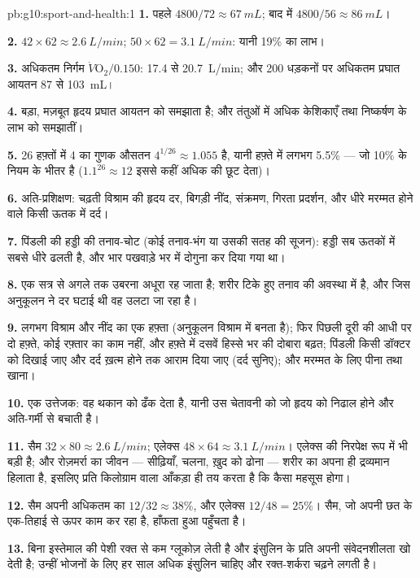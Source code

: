 \begin{solution}{pb:g10:sport-and-health:1}
\textbf{1.} पहले $4800/72 \approx \qty{67}{mL}$; बाद में $4800/56 \approx
\qty{86}{mL}$।

\textbf{2.} $42 \times 62 \approx \qty{2.6}{L/min}$; $50 \times 62 =
\qty{3.1}{L/min}$: यानी 19\% का लाभ।

\textbf{3.} अधिकतम निर्गम $\dot V\!\mathrm{O_2}/0.150$: \num{17.4} से
\qty{20.7}{L/min}; और 200 धड़कनों पर अधिकतम प्रघात आयतन \num{87} से
\qty{103}{mL}।

\textbf{4.} बड़ा, मज़बूत हृदय प्रघात आयतन को समझाता है; और तंतुओं में
अधिक केशिकाएँ तथा  निष्कर्षण के लाभ को समझातीं।

\textbf{5.} 26 हफ़्तों में 4 का गुणक औसतन $4^{1/26}
\approx 1.055$ है, यानी हफ़्ते में लगभग 5.5\% --- जो 10\% के नियम के भीतर
है ($1.1^{26}
\approx 12$ इससे कहीं अधिक की छूट देता)।

\textbf{6.} अति-प्रशिक्षण: चढ़ती विश्राम की हृदय दर, बिगड़ी नींद,
संक्रमण, गिरता प्रदर्शन, और धीरे मरम्मत होने वाले किसी ऊतक में दर्द।

\textbf{7.} पिंडली की हड्डी की तनाव-चोट (कोई तनाव-भंग या उसकी सतह की
सूजन): हड्डी सब ऊतकों में सबसे धीरे ढलती है, और भार पखवाड़े भर में दोगुना
कर दिया गया था।

\textbf{8.} एक सत्र से अगले तक उबरना अधूरा रह जाता है; शरीर टिके हुए
तनाव की अवस्था में है, और जिस अनुकूलन ने दर घटाई थी वह उलटा जा रहा है।

\textbf{9.} लगभग विश्राम और नींद का एक हफ़्ता (अनुकूलन विश्राम में बनता
है); फिर पिछली दूरी की आधी पर दो हफ़्ते, कोई रफ़्तार का काम नहीं, और
हफ़्ते में दसवें हिस्से भर की दोबारा बढ़त; पिंडली किसी डॉक्टर को दिखाई
जाए और दर्द ख़त्म होने तक आराम दिया जाए (दर्द सुनिए); और मरम्मत के लिए
पीना तथा खाना।

\textbf{10.} एक उत्तेजक: वह थकान को ढँक देता है, यानी उस चेतावनी को जो
हृदय को निढाल होने और अति-गर्मी से बचाती है।

\textbf{11.} सैम $32 \times 80 \approx \qty{2.6}{L/min}$; एलेक्स $48
\times 64 \approx \qty{3.1}{L/min}$। एलेक्स की निरपेक्ष रूप में भी बड़ी
है; और रोज़मर्रा का जीवन --- सीढ़ियाँ, चलना, ख़ुद को ढोना --- शरीर का
अपना ही द्रव्यमान हिलाता है, इसलिए प्रति किलोग्राम वाला आँकड़ा ही तय करता
है कि कैसा महसूस होगा।

\textbf{12.} सैम अपनी अधिकतम का $12/32 \approx 38\%$, और एलेक्स $12/48 =
25\%$। सैम, जो अपनी छत के एक-तिहाई से ऊपर काम कर रहा है, हाँफता हुआ
पहुँचता है।

\textbf{13.} बिना इस्तेमाल की पेशी रक्त से कम ग्लूकोज़ लेती है और
इंसुलिन के प्रति अपनी संवेदनशीलता खो देती है; उन्हीं भोजनों के लिए हर साल
अधिक इंसुलिन चाहिए और रक्त-शर्करा चढ़ने लगती है।


\end{solution}

